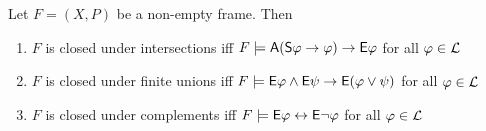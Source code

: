 \begin{proposition}
\label{exp_prop_frame_conditions}

    Let $F = (X, P)$ be a non-empty frame. Then

    \begin{enumerate}

        \item\label{exp_item_frame_condition_intersections} $F$ is closed under
            intersections iff $F \models \mathsf{A}(\mathsf{S}\varphi \to \varphi) \to
            \mathsf{E}\varphi$ for all $\varphi \in \mathcal{L}$

        \item\label{exp_item_frame_condition_finunions} $F$ is closed under finite
            unions iff $F \models \mathsf{E}\varphi \land \mathsf{E}\psi \to \mathsf{E}(\varphi \lor
            \psi)$ for all $\varphi \in \mathcal{L}$

        \item\label{exp_item_frame_condition_compl} $F$ is closed under complements
            iff $F \models \mathsf{E}\varphi \leftrightarrow \mathsf{E}\neg\varphi$ for all $\varphi \in \mathcal{L}$

    \end{enumerate}
\end{proposition}

